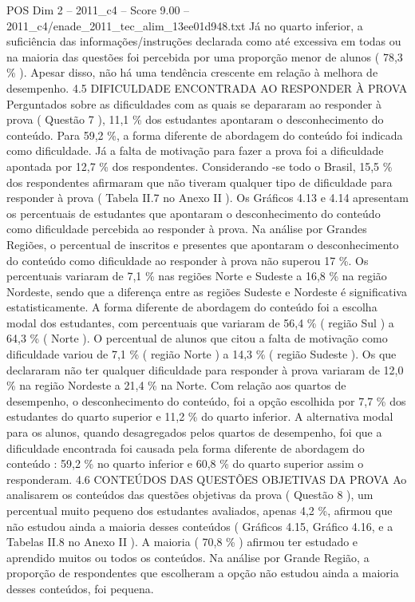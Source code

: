 \begin{textsample}{POS Dim 2 – 2011\_c4 – Score 9.00 – 2011\_c4/enade\_2011\_tec\_alim\_13ee01d948.txt}
Já no quarto inferior, a suficiência das informações/instruções declarada como até excessiva em todas ou na maioria das questões foi percebida por uma proporção menor de alunos ( 78,3 \% ).
Apesar disso, não há uma tendência crescente em relação à melhora de desempenho. 4.5 DIFICULDADE ENCONTRADA AO RESPONDER À PROVA Perguntados sobre as dificuldades com as quais se depararam ao responder à prova ( Questão 7 ), 11,1 \% dos estudantes apontaram o desconhecimento do conteúdo.
Para 59,2 \%, a forma diferente de abordagem do conteúdo foi indicada como dificuldade.
Já a falta de motivação para fazer a prova foi a dificuldade apontada por 12,7 \% dos respondentes.
Considerando -se todo o Brasil, 15,5 \% dos respondentes afirmaram que não tiveram qualquer tipo de dificuldade para responder à prova ( Tabela II.7 no Anexo II ).
Os Gráficos 4.13 e 4.14 apresentam os percentuais de estudantes que apontaram o desconhecimento do conteúdo como dificuldade percebida ao responder à prova.
Na análise por Grandes Regiões, o percentual de inscritos e presentes que apontaram o desconhecimento do conteúdo como dificuldade ao responder à prova não superou 17 \%.
Os percentuais variaram de 7,1 \% nas regiões Norte e Sudeste a 16,8 \% na região Nordeste, sendo que a diferença entre as regiões Sudeste e Nordeste é significativa estatisticamente.
A forma diferente de abordagem do conteúdo foi a escolha modal dos estudantes, com percentuais que variaram de 56,4 \% ( região Sul ) a 64,3 \% ( Norte ).
O percentual de alunos que citou a falta de motivação como dificuldade variou de 7,1 \% ( região Norte ) a 14,3 \% ( região Sudeste ).
Os que declararam não ter qualquer dificuldade para responder à prova variaram de 12,0 \% na região Nordeste a 21,4 \% na Norte.
Com relação aos quartos de desempenho, o desconhecimento do conteúdo, foi a opção escolhida por 7,7 \% dos estudantes do quarto superior e 11,2 \% do quarto inferior.
A alternativa modal para os alunos, quando desagregados pelos quartos de desempenho, foi que a dificuldade encontrada foi causada pela forma diferente de abordagem do conteúdo : 59,2 \% no quarto inferior e 60,8 \% do quarto superior assim o responderam. 4.6 CONTEÚDOS DAS QUESTÕES OBJETIVAS DA PROVA Ao analisarem os conteúdos das questões objetivas da prova ( Questão 8 ), um percentual muito pequeno dos estudantes avaliados, apenas 4,2 \%, afirmou que não estudou ainda a maioria desses conteúdos ( Gráficos 4.15, Gráfico 4.16, e a Tabelas II.8 no Anexo II ).
A maioria ( 70,8 \% ) afirmou ter estudado e aprendido muitos ou todos os conteúdos.
Na análise por Grande Região, a proporção de respondentes que escolheram a opção não estudou ainda a maioria desses conteúdos, foi pequena.

\end{textsample}
